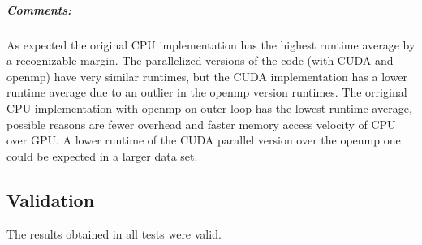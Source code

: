 \subparagraph{Comments:} As expected the original CPU implementation has the highest runtime average by a recognizable margin. The parallelized versions of the code (with CUDA and openmp) have very similar runtimes, but the CUDA implementation has a lower runtime average due to an outlier in the openmp version runtimes. The orriginal CPU implementation with openmp on outer loop has the lowest runtime average, possible reasons are fewer overhead and faster memory access velocity of CPU over GPU. A lower runtime of the CUDA parallel version over the openmp one could be expected in a larger data set.

\subsection{Validation}
The results obtained in all tests were valid.
